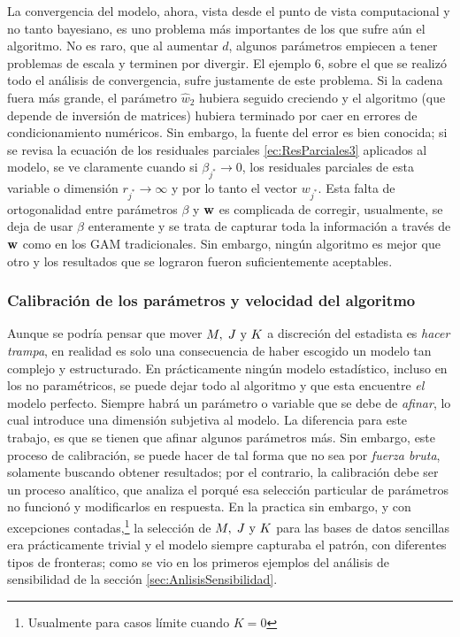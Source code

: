 \documentclass[../Main/Main.tex]{subfiles}
\begin{document}
La convergencia del modelo, ahora, vista desde el punto de vista computacional y no tanto bayesiano, es uno problema más importantes de los que sufre aún el algoritmo. No es raro, que al aumentar $d$, algunos parámetros empiecen a tener problemas de escala y terminen por divergir. El ejemplo 6, sobre el que se realizó todo el análisis de convergencia, sufre justamente de este problema. Si la cadena fuera más grande, el parámetro $\hat{w}_2$ hubiera seguido creciendo y el algoritmo (que depende de inversión de matrices) hubiera terminado por caer en errores de condicionamiento numéricos. Sin embargo, la fuente del error es bien conocida; si se revisa la ecuación de los residuales parciales \ref{ec:ResParciales3} aplicados al modelo, se ve claramente cuando si $\beta_{j^*}\rightarrow0$, los residuales parciales de esta variable o dimensión $r_{j^*} \rightarrow \infty$ y por lo tanto el vector $w_{j^*}$. Esta falta de ortogonalidad entre parámetros $\beta$ y $\mathbf{w}$ es complicada de corregir, usualmente, se deja de usar $\beta$ enteramente y se trata de capturar toda la información a través de $\mathbf{w}$ como en los GAM tradicionales. Sin embargo, ningún algoritmo es mejor que otro y los resultados que se lograron fueron suficientemente aceptables.

\subsubsection*{Calibración de los parámetros y velocidad del algoritmo}
Aunque se podría pensar que mover $M,\;J\text{ y }K$ a discreción del estadista es \textit{hacer trampa}, en realidad es solo una consecuencia de haber escogido un modelo tan complejo y estructurado. En prácticamente ningún modelo estadístico, incluso en los no paramétricos, se puede dejar todo al algoritmo y que esta encuentre \textit{el} modelo perfecto. Siempre habrá un parámetro o variable que se debe de \textit{afinar}, lo cual introduce una dimensión subjetiva al modelo. La diferencia para este trabajo, es que se tienen que afinar algunos parámetros más. Sin embargo, este proceso de calibración, se puede hacer de tal forma que no sea por \textit{fuerza bruta}, solamente buscando obtener resultados; por el contrario, la calibración debe ser un proceso analítico, que analiza el porqué esa selección particular de parámetros no funcionó y modificarlos en respuesta. En la practica sin embargo, y con excepciones contadas,\footnote{Usualmente para casos límite cuando $K = 0$} la selección de $M,\;J\text{ y }K$ para las bases de datos sencillas era prácticamente trivial y el modelo siempre capturaba el patrón, con diferentes tipos de fronteras; como se vio en los primeros ejemplos del análisis de sensibilidad de la sección \ref{sec:AnlisisSensibilidad}.
\end{document}
